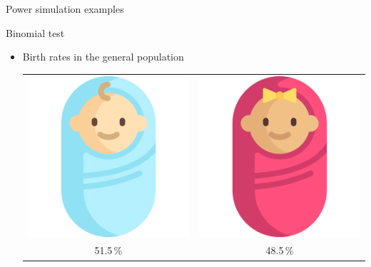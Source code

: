 \documentclass[aspectratio=169]{beamer}
\begin{document}
\begin{frame}{Power simulation examples}

Binomial test\\[1ex]

\begin{itemize}
\item Birth rates in the general population\\[1ex]

\begin{tabular}{cc}
  \includegraphics[scale=.1]{fig/babyboy} & 
  \includegraphics[scale=.1]{fig/babygirl}\\
  51.5\,\% & 48.5\,\%\\
\end{tabular}


\end{itemize}
\end{frame}
\end{document}
